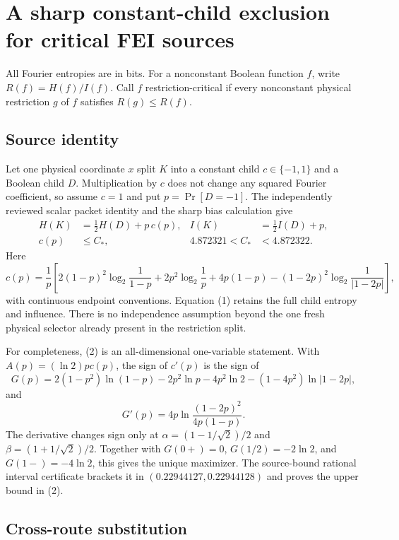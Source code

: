\section*{A sharp constant-child exclusion for critical FEI sources}

All Fourier entropies are in bits.  For a nonconstant Boolean function $f$,
write $R(f)=H(f)/I(f)$.  Call $f$ restriction-critical if every nonconstant
physical restriction $g$ of $f$ satisfies $R(g)\le R(f)$.

\subsection*{Source identity}

Let one physical coordinate $x$ split $K$ into a constant child $c\in
\{-1,1\}$ and a Boolean child $D$.  Multiplication by $c$ does not change
any squared Fourier coefficient, so assume $c=1$ and put
$p=\Pr[D=-1]$.  The independently reviewed scalar packet identity and the
sharp bias calculation give
\begin{align}
 H(K)&=\frac12H(D)+p\,c(p), &
 I(K)&=\frac12I(D)+p,                                      \tag{1}\\
 c(p)&\le C_*, &
 4.872321<C_*&<4.872322.                                   \tag{2}
\end{align}
Here
\[
c(p)=\frac1p\left[
2(1-p)^2\log_2\frac1{1-p}+2p^2\log_2\frac1p+4p(1-p)
-(1-2p)^2\log_2\frac1{|1-2p|}\right],                     \tag{3}
\]
with continuous endpoint conventions.  Equation (1) retains the full child
entropy and influence.  There is no independence assumption beyond the one
fresh physical selector already present in the restriction split.

For completeness, (2) is an all-dimensional one-variable statement.  With
$A(p)=(\ln2)p c(p)$, the sign of $c'(p)$ is the sign of
\[
G(p)=2(1-p^2)\ln(1-p)-2p^2\ln p-4p^2\ln2
 -(1-4p^2)\ln|1-2p|,                                      \tag{4}
\]
and
\[
G'(p)=4p\ln\frac{(1-2p)^2}{4p(1-p)}.                       \tag{5}
\]
The derivative changes sign only at
$\alpha=(1-1/\sqrt2)/2$ and $\beta=(1+1/\sqrt2)/2$.
Together with $G(0+)=0$, $G(1/2)=-2\ln2$, and
$G(1-)=-4\ln2$, this gives the unique maximizer.  The source-bound rational
interval certificate brackets it in $(0.22944127,0.22944128)$ and proves the
upper bound in (2).

\subsection*{Cross-route substitution}

